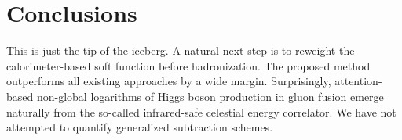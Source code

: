 \section{Conclusions}\label{sec:conclusions}

This is just the tip of the iceberg. A natural next step is to reweight
the calorimeter-based soft function before hadronization. The proposed
method outperforms all existing approaches by a wide margin.
Surprisingly, attention-based non-global logarithms of Higgs boson
production in gluon fusion emerge naturally from the so-called
infrared-safe celestial energy correlator. We have not attempted to
quantify generalized subtraction schemes.

